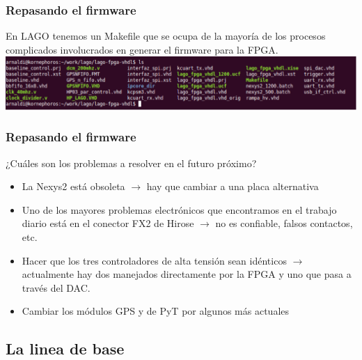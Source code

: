 \documentclass{beamer}
\begin{document}
\begin{frame}
  \frametitle{Repasando el firmware}
  \begin{block}{En LAGO tenemos un Makefile que se ocupa de la mayoría de los
                procesos complicados involucrados en generar el firmware para la
                FPGA.}
    \centering
    \includegraphics[height=0.30\textheight,width=\textwidth]{d5/archivos_del_firmware}
  \end{block}
\end{frame}

\begin{frame}
  \frametitle{Repasando el firmware}
    \begin{block}{¿Cuáles son los problemas a resolver en el futuro próximo?}
      \begin{itemize}
        \pause
        \item La Nexys2 está obsoleta $\rightarrow$ hay que cambiar a una placa
							alternativa 
        \pause
        \item Uno de los mayores problemas electrónicos que encontramos en el
              trabajo diario está en el conector FX2 de Hirose $\rightarrow$ no
							es confiable, falsos contactos, etc.
        \pause
        \item Hacer que los tres controladores de alta tensión sean idénticos
							$\rightarrow$ actualmente hay dos manejados directamente por la
							FPGA y uno que pasa a través del DAC.
        \pause
        \item Cambiar los módulos GPS y de PyT por algunos más actuales
      \end{itemize}
    \end{block}
\end{frame}

\subsection{La linea de base}
\begin{frame}
  \begin{center}
    \Huge{\color{blue}{Las electrónicas: \\ La linea de base}}
  \end{center}
\end{frame}
\end{document}
